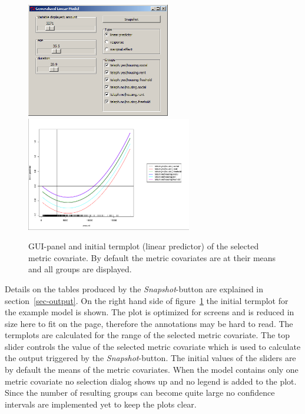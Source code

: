 \documentclass[nojss]{jss}
\begin{document}
\begin{enumerate}[leftmargin=1cm, rightmargin=0.5cm, label={\arabic{enumi}.}]
\begin{figure}[ht]
\centering
\includegraphics[height=5cm, width=6.26cm]{fig-002-1}   \quad \includegraphics[height=5cm, width=7.233cm]{fig-002-2.pdf}
\caption{GUI-panel and initial termplot (linear predictor) of the selected metric covariate. By default the metric covariates are at their means and all groups are displayed.} \label{fig-002}
\end{figure}
\end{enumerate}

Details on the tables produced by the \textit{Snapshot}-button are explained in section~\ref{sec-output}.
On the right hand side of figure~\ref{fig-002} the initial termplot for the example model is shown.  The plot is optimized for screens and is reduced in size here to fit on the page, therefore the annotations may be hard to read. The termplots are calculated for the range of the selected metric covariate. The top slider controls the value of the selected metric covariate which is used to calculate the output triggered by the \emph{Snapshot}-button. The initial values of the sliders are by default the means of the metric covariates. When the model contains only one metric covariate no selection dialog shows up and no legend is added to the plot. Since the number of resulting groups can become quite large no confidence intervals are implemented yet to keep the plots clear. 

\pagebreak
\end{document}
